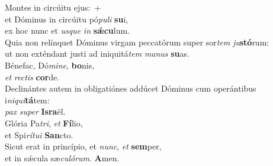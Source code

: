 \evenverse Montes in circúitu ejus:~+\\\evenverse  et Dóminus in circúitu pó\textit{pu}\textit{li} \textbf{su}i,~\*\\
\evenverse ex hoc nunc et \textit{us}\textit{que} \textit{in} \textbf{sǽ}\textbf{cu}lum.\\
\oddverse Quia non relínquet Dóminus virgam peccatórum super sor\textit{tem} \textit{ju}\textbf{stó}rum:~\*\\
\oddverse ut non exténdant justi ad iniquitá\textit{tem} \textit{ma}\textit{nus} \textbf{su}as.\\
\evenverse Bénefac, Dó\textit{mi}\textit{ne}, \textbf{bo}nis,~\*\\
\evenverse \textit{et} \textit{re}\textit{ctis} \textbf{cor}de.\\
\oddverse Declinántes autem in obligatiónes addúcet Dóminus cum operántibus i\textit{ni}\textit{qui}\textbf{tá}tem:~\*\\
\oddverse \textit{pax} \textit{su}\textit{per} \textbf{Is}\textbf{ra}ël.\\
\evenverse Glória Pa\textit{tri}, \textit{et} \textbf{Fí}lio,~\*\\
\evenverse et Spi\textit{rí}\textit{tu}\textit{i} \textbf{San}cto.\\
\oddverse Sicut erat in princípio, et \textit{nunc}, \textit{et} \textbf{sem}per,~\*\\
\oddverse et in sǽcula sæ\textit{cu}\textit{ló}\textit{rum}. \textbf{A}men.\\
